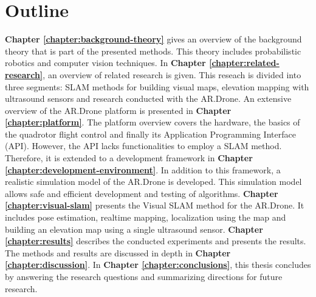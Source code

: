 	\section{Outline}
\textbf{Chapter \ref{chapter:background-theory}} gives an overview of the background theory that is part of the presented methods.
This theory includes probabilistic robotics and computer vision techniques.
In \textbf{Chapter \ref{chapter:related-research}}, an overview of related research is given.
This reseach is divided into three segments: SLAM methods for building visual maps, elevation mapping with ultrasound sensors and research conducted with the AR.Drone.
An extensive overview of the AR.Drone platform is presented in \textbf{Chapter \ref{chapter:platform}}.
The platform overview covers the hardware, the basics of the quadrotor flight control and finally its Application Programming Interface (API).
However, the API lacks functionalities to employ a SLAM method.
Therefore, it is extended to a development framework in \textbf{Chapter \ref{chapter:development-environment}}.
In addition to this framework, a realistic simulation model of the AR.Drone is developed.
This simulation model allows safe and efficient development and testing of algorithms.
\textbf{Chapter \ref{chapter:visual-slam}} presents the Visual SLAM method for the AR.Drone.
It includes pose estimation, realtime  mapping, localization using the map and building an elevation map using a single ultrasound sensor.
\textbf{Chapter \ref{chapter:results}} describes the conducted experiments and presents the results.
The methods and results are discussed in depth in \textbf{Chapter \ref{chapter:discussion}}.
In \textbf{Chapter \ref{chapter:conclusions}}, this thesis concludes by answering the research questions and summarizing directions for future research.